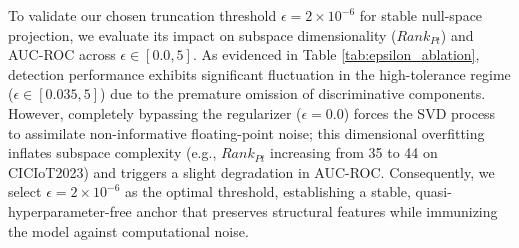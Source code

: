 \documentclass[final,twocolumn,10pt]{elsarticle}
\begin{document}
To validate our chosen truncation threshold $\epsilon = 2 \times 10^{-6}$ for stable null-space projection, we evaluate its impact on subspace dimensionality ($Rank_{Pt}$) and AUC-ROC across $\epsilon \in [0.0, 5]$.
As evidenced in Table \ref{tab:epsilon_ablation}, detection performance exhibits significant fluctuation in the high-tolerance regime ($\epsilon \in [0.035, 5]$) due to the premature omission of discriminative components. However, completely bypassing the regularizer ($\epsilon = 0.0$) forces the SVD process to assimilate non-informative floating-point noise; this dimensional overfitting inflates subspace complexity (e.g., $Rank_{Pt}$ increasing from 35 to 44 on CICIoT2023) and triggers a slight degradation in AUC-ROC. Consequently, we select $\epsilon = 2 \times 10^{-6}$ as the optimal threshold, establishing a stable, quasi-hyperparameter-free anchor that preserves structural features while immunizing the model against computational noise.

\begin{table}[ht]
\centering
\caption{Impact of the SVD truncation threshold ($\epsilon$) on subspace rank ($Rank_{Pt}$) and AUC-ROC (\%) across the evaluated datasets.}
\label{tab:epsilon_ablation}
\end{table}
\end{document}
